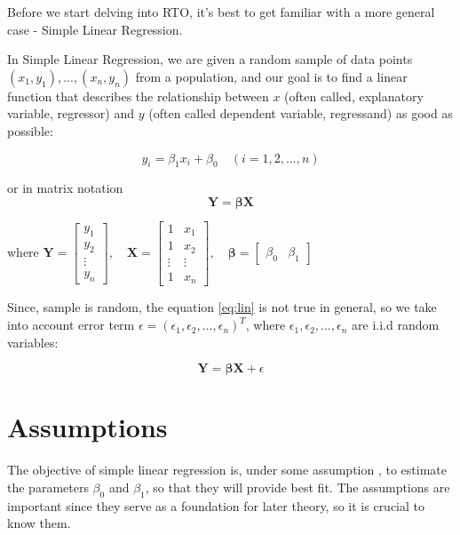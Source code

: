 \documentclass[12pt,a4paper,oneside]{book} %
\begin{document}
Before we start delving into RTO, it's best to get familiar with a more general case - Simple Linear Regression.

In Simple Linear Regression, we are given a random sample of data points $(x_1,y_1),...,(x_n,y_n)$ from a population, and our goal is to find a linear function that describes the relationship between $x$ (often called, explanatory variable, regressor) and $y$ (often called dependent variable, regressand) as good as possible: 


\begin{equation}\label{eq:lin}
	y_i = \beta_1 x_i + \beta_0 \quad (i= 1,2,...,n)
\end{equation}

or in matrix notation 
\begin{equation*}
	\mathbf{Y} = \mathbf{\beta} \mathbf{X}
\end{equation*}


where  $\mathbf{Y} = 
\begin{bmatrix}
	y_1\\
	y_2 \\
	\vdots \\
	y_n
\end{bmatrix},
\quad
\mathbf{X} = 
\begin{bmatrix}
	1 & x_1 \\
	1 & x_2 \\
	\vdots & \vdots \\
	1 & x_n
\end{bmatrix}, \quad
\mathbf{\beta} =
\begin{bmatrix}
	\beta_0 & \beta_1
\end{bmatrix}
$



Since, sample is random, the equation \eqref{eq:lin} is not true in general, so we take into account error term $\epsilon = (\epsilon_1, \epsilon_2, ... , \epsilon_n)^T$, where $\epsilon_1, \epsilon_2, ... , \epsilon_n$ are i.i.d random variables:

\begin{equation}\label{eq:linear regression} 
	\mathbf{Y} = \mathbf{\beta} \mathbf{X} + \epsilon
\end{equation}


\section{Assumptions}
The objective of simple linear regression is, under some assumption \cite[p.4-12]{hayashi2011econometrics}, to estimate the parameters $\beta_0$ and $\beta_1$, so that they will provide best fit. The assumptions are important since they serve as a foundation for later theory, so it is crucial to know them.
\end{document}
